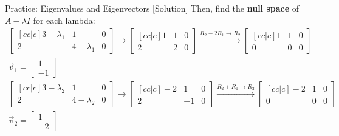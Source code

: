 \begin{frame}{Practice: Eigenvalues and Eigenvectors [Solution]}
    Then, find the \textbf{null space} of $A - \lambda I$ for each lambda:
    \begin{align*}
        \begin{bmatrix}[c c | c]
            3 - \lambda_1 & 1 & 0 \\
            2 & 4 - \lambda_1 & 0
        \end{bmatrix} \longrightarrow
        \begin{bmatrix}[c c | c]
            1 & 1 & 0 \\
            2 & 2 & 0
        \end{bmatrix} \xrightarrow[]{R_2 - 2R_1 \to R_2}
        \begin{bmatrix}[c c | c]
            1 & 1 & 0 \\
            0 & 0 & 0
        \end{bmatrix} \\
        \vec{v}_1 = \begin{bmatrix}
            1 \\ -1
        \end{bmatrix} \\[2ex]
        \begin{bmatrix}[c c | c]
            3 - \lambda_2 & 1 & 0 \\
            2 & 4 - \lambda_2 & 0
        \end{bmatrix} \longrightarrow
        \begin{bmatrix}[c c | c]
            -2 & 1 & 0 \\
            2 & -1 & 0
        \end{bmatrix} \xrightarrow[]{R_2 + R_1 \to R_2}
        \begin{bmatrix}[c c | c]
            -2 & 1 & 0 \\
            0 & 0 & 0
        \end{bmatrix} \\
        \vec{v}_2 = \begin{bmatrix}
            1 \\ -2
        \end{bmatrix}
    \end{align*}
\end{frame}

